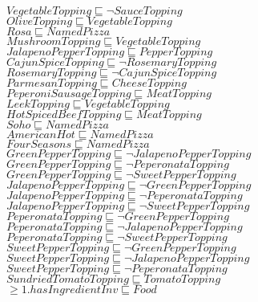 \documentclass[a4paper,10pt]{article}
\begin{document}
 $VegetableTopping \sqsubseteq  \lnot SauceTopping$\\ 
 $OliveTopping \sqsubseteq VegetableTopping$\\ 
 $Rosa \sqsubseteq NamedPizza$\\ 
 $MushroomTopping \sqsubseteq VegetableTopping$\\ 
 $JalapenoPepperTopping \sqsubseteq PepperTopping$\\ 
 $CajunSpiceTopping \sqsubseteq  \lnot RosemaryTopping$\\ 
 $RosemaryTopping \sqsubseteq  \lnot CajunSpiceTopping$\\ 
 $ParmesanTopping \sqsubseteq CheeseTopping$\\ 
 $PeperoniSausageTopping \sqsubseteq MeatTopping$\\ 
 $LeekTopping \sqsubseteq VegetableTopping$\\ 
 $HotSpicedBeefTopping \sqsubseteq MeatTopping$\\ 
 $Soho \sqsubseteq NamedPizza$\\ 
 $AmericanHot \sqsubseteq NamedPizza$\\ 
 $FourSeasons \sqsubseteq NamedPizza$\\ 
 $GreenPepperTopping \sqsubseteq  \lnot JalapenoPepperTopping$\\ 
 $GreenPepperTopping \sqsubseteq  \lnot PeperonataTopping$\\ 
 $GreenPepperTopping \sqsubseteq  \lnot SweetPepperTopping$\\ 
 $JalapenoPepperTopping \sqsubseteq  \lnot GreenPepperTopping$\\ 
 $JalapenoPepperTopping \sqsubseteq  \lnot PeperonataTopping$\\ 
 $JalapenoPepperTopping \sqsubseteq  \lnot SweetPepperTopping$\\ 
 $PeperonataTopping \sqsubseteq  \lnot GreenPepperTopping$\\ 
 $PeperonataTopping \sqsubseteq  \lnot JalapenoPepperTopping$\\ 
 $PeperonataTopping \sqsubseteq  \lnot SweetPepperTopping$\\ 
 $SweetPepperTopping \sqsubseteq  \lnot GreenPepperTopping$\\ 
 $SweetPepperTopping \sqsubseteq  \lnot JalapenoPepperTopping$\\ 
 $SweetPepperTopping \sqsubseteq  \lnot PeperonataTopping$\\ 
 $SundriedTomatoTopping \sqsubseteq TomatoTopping$\\ 
 $ \ge 1.hasIngredientInv \sqsubseteq Food$\\ 
\end{document}
